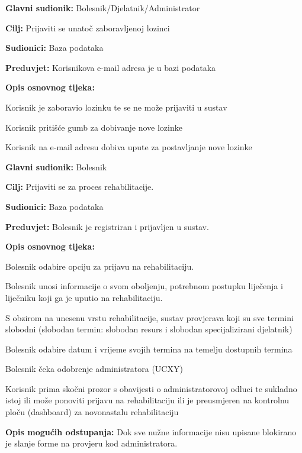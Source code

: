 	\item \textbf{Glavni sudionik:} Bolesnik/Djelatnik/Administrator
 	\item \textbf{Cilj:} Prijaviti se unatoč zaboravljenoj lozinci
  	\item \textbf{Sudionici:} Baza podataka
   	\item \textbf{Preduvjet:} Korisnikova e-mail adresa je u bazi podataka
    	\item \textbf{Opis osnovnog tijeka:}
     	\begin{packed_enum}
      		\item Korisnik je zaboravio lozinku te se ne može prijaviti u sustav
		\item Korisnik pritišće gumb za dobivanje nove lozinke
  		\item Korisnik na e-mail adresu dobiva upute za postavljanje nove lozinke
    	\end{packed_enum}
\closeusecase


	\item \textbf{Glavni sudionik:} Bolesnik
	\item \textbf{Cilj:} Prijaviti se za proces rehabilitacije.
	\item \textbf{Sudionici:} Baza podataka
	\item \textbf{Preduvjet:} Bolesnik je registriran i prijavljen u sustav.
	\item \textbf{Opis osnovnog tijeka:}
	\begin{packed_enum}
		\item Bolesnik odabire opciju za prijavu na rehabilitaciju.
		\item Bolesnik unosi informacije o svom oboljenju, potrebnom postupku liječenja i liječniku koji ga je uputio na rehabilitaciju.
        	\item S obzirom na unesenu vrstu rehabilitacije, sustav provjerava koji su sve termini slobodni (slobodan termin: slobodan resurs i slobodan specijalizirani djelatnik) 
		\item Bolesnik odabire datum i vrijeme svojih termina na temelju dostupnih termina 
        	\item Bolesnik čeka odobrenje administratora (UCXY) 
        	\item Korisnik prima skočni prozor s obavijesti o administratorovoj odluci te sukladno istoj ili može ponoviti prijavu na rehabilitaciju ili je preusmjeren na kontrolnu ploču (dashboard) za novonastalu rehabilitaciju
	\end{packed_enum}
	\item \textbf{Opis mogućih odstupanja:}
	Dok sve nužne informacije nisu upisane blokirano je slanje forme na provjeru kod administratora. 
\closeusecase


